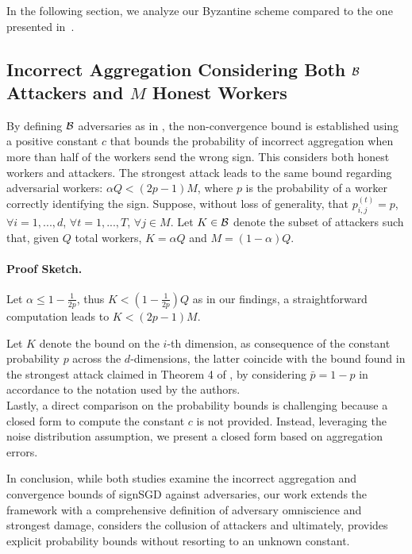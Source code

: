 In the following section, we analyze our Byzantine scheme compared to the one presented in~\cite{jin2024sign}.


\subsection{Incorrect Aggregation Considering Both \(\mathcal B\) Attackers and \(M\) Honest Workers}
By defining \(\mathcal B\) adversaries as in \cite{jin2024sign}, the non-convergence bound is established using a positive constant \(c\) that bounds the probability of incorrect aggregation when more than half of the workers send the wrong sign. This considers both honest workers  and attackers. The strongest attack leads to the same bound regarding adversarial workers: \(\alpha Q < (2p - 1) M\), where \( p \) is the probability of a worker correctly identifying the sign. Suppose, without loss of generality, that $p_{i,j}^{(t)} = p$, $\forall i = 1,...,d$, $\forall t = 1,...,T$, $\forall j \in M$. Let \( K \in \mathcal B\) denote the subset of attackers such that, given \( Q \) total workers, \( K = \alpha  Q \) and \( M = (1 - \alpha) Q \).

\paragraph{Proof Sketch.}
Let $\alpha \leq 1 - \frac{1}{2p}$, thus $ K < (1 - \frac{1}{2p})Q$ as in our findings, a straightforward computation leads to $K < (2p - 1) M$.


Let $K$ denote the bound on the $i$-th dimension, as consequence of the constant probability $p$ across the $d$-dimensions, the latter coincide with the bound found in the strongest attack claimed in Theorem 4 of \cite{jin2024sign}, by considering $\bar p = 1 -p$ in accordance to the notation used by the authors.\\
Lastly, a direct comparison on the probability bounds is challenging because a closed form to compute the constant \( c \) is not provided. Instead, leveraging the noise distribution assumption, we present a closed form based on aggregation errors.

In conclusion, while both studies examine the incorrect aggregation and convergence bounds of signSGD against adversaries, our work extends the framework with a comprehensive definition of adversary omniscience and strongest damage, considers the collusion of attackers and ultimately, provides explicit probability bounds without resorting to an unknown constant.

